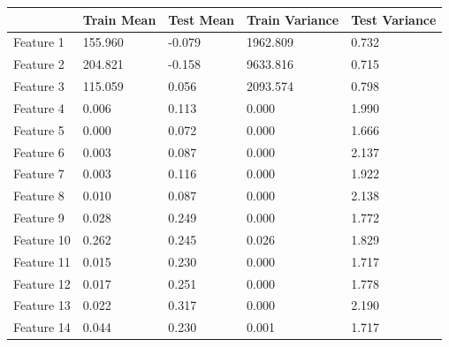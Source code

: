 \documentclass[12pt]{article}
\begin{document}
    \begin{table}[h]
      \begin{tabular}{l|l|l|l|l|}
      \cline{2-5}
                                        & Train Mean    & Test Mean     & Train Variance & Test Variance \\ \hline
      \multicolumn{1}{|l|}{Feature 1}   & 155.960       & -0.079        & 1962.809       & 0.732         \\ \hline
      \multicolumn{1}{|l|}{Feature 2}   & 204.821       & -0.158        & 9633.816       & 0.715         \\ \hline
      \multicolumn{1}{|l|}{Feature 3}   & 115.059       & 0.056         & 2093.574       & 0.798         \\ \hline                         
      \multicolumn{1}{|l|}{Feature 4}   & 0.006         & 0.113         & 0.000          & 1.990         \\ \hline                         
      \multicolumn{1}{|l|}{Feature 5}   & 0.000         & 0.072         & 0.000          & 1.666         \\ \hline                         
      \multicolumn{1}{|l|}{Feature 6}   & 0.003         & 0.087         & 0.000          & 2.137         \\ \hline                         
      \multicolumn{1}{|l|}{Feature 7}   & 0.003         & 0.116         & 0.000          & 1.922         \\ \hline                         
      \multicolumn{1}{|l|}{Feature 8}   & 0.010         & 0.087         & 0.000          & 2.138         \\ \hline                         
      \multicolumn{1}{|l|}{Feature 9}   & 0.028         & 0.249         & 0.000          & 1.772         \\ \hline                         
      \multicolumn{1}{|l|}{Feature 10}  & 0.262         & 0.245         & 0.026          & 1.829         \\ \hline                         
      \multicolumn{1}{|l|}{Feature 11}  & 0.015         & 0.230         & 0.000          & 1.717         \\ \hline                         
      \multicolumn{1}{|l|}{Feature 12}  & 0.017         & 0.251         & 0.000          & 1.778         \\ \hline                         
      \multicolumn{1}{|l|}{Feature 13}  & 0.022         & 0.317         & 0.000          & 2.190         \\ \hline                         
      \multicolumn{1}{|l|}{Feature 14}  & 0.044         & 0.230         & 0.001          & 1.717         \\ \hline                         

\end{tabular}
\end{table}
\end{document}
